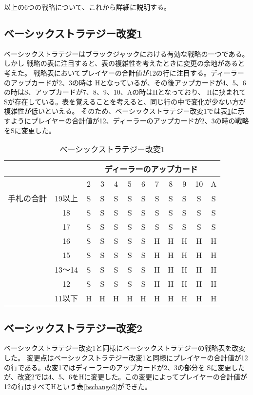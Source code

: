 以上の6つの戦略について、これから詳細に説明する。

\subsection{ベーシックストラテジー改変1}
ベーシックストラテジーはブラックジャックにおける有効な戦略の一つである。しかし
戦略の表に注目すると、表の複雑性を考えたときに変更の余地があると考えた。
戦略表においてプレイヤーの合計値が12の行に注目する。ディーラーのアップカードが2、3の時は
Hとなっているが、その後アップカードが4、5、6の時はS、アップカードが7、8、9、10、Aの時はHとなっており、
Hに挟まれてSが存在している。表を覚えることを考えると、同じ行の中で変化が少ない方が複雑性が低いといえる。
そのため、ベーシックストラテジー改変1では表\ref{bschange1}に示すようにプレイヤーの合計値が12、ディーラーのアップカードが2、3の時の戦略をSに変更した。

\begin{table}[htbp]
  \centering
  \caption{ベーシックストラテジー改変1\label{bschange1}}
  \begin{tabular}{|c|c|c|c|c|c|c|c|c|c|c|c|}
    \hline
    \multicolumn{2}{|c|}{} & \multicolumn{10}{|c|}{ディーラーのアップカード} \\ \hline
    \multicolumn{2}{|c|}{} & 2 & 3 & 4 & 5 & 6 & 7 & 8 & 9 & 10 & A \\ \hline
    手札の合計 & 19以上 & S & S & S & S & S & S & S & S & S & S \\ \cline{3-12}
              & 18 & S & S & S & S & S & S & S & S & S & S \\ \cline{3-12}
              & 17 & S & S & S & S & S & S & S & S & S & S \\ \cline{3-12}
              & 16 & S & S & S & S & S & H & H & H & H & H \\ \cline{3-12}
              & 15 & S & S & S & S & S & H & H & H & H & H \\ \cline{3-12}
              & 13～14 & S & S & S & S & S & H & H & H & H & H \\ \cline{3-12}
              & 12 & S & S & S & S & S & H & H & H & H & H \\ \cline{3-12}
              & 11以下 & H & H & H & H & H & H & H & H & H & H \\ \hline
  \end{tabular}
\end{table}

\subsection{ベーシックストラテジー改変2}
ベーシックストラテジー改変1と同様にベーシックストラテジーの戦略表を改変した。
変更点はベーシックストラテジー改変1と同様にプレイヤーの合計値が12の行である。改変1ではディーラーのアップカードが2、3の部分を
Sに変更したが、改変2では4、5、6をHに変更した。この変更によってプレイヤーの合計値が12の行はすべてHという表\ref{bschange2}ができた。

